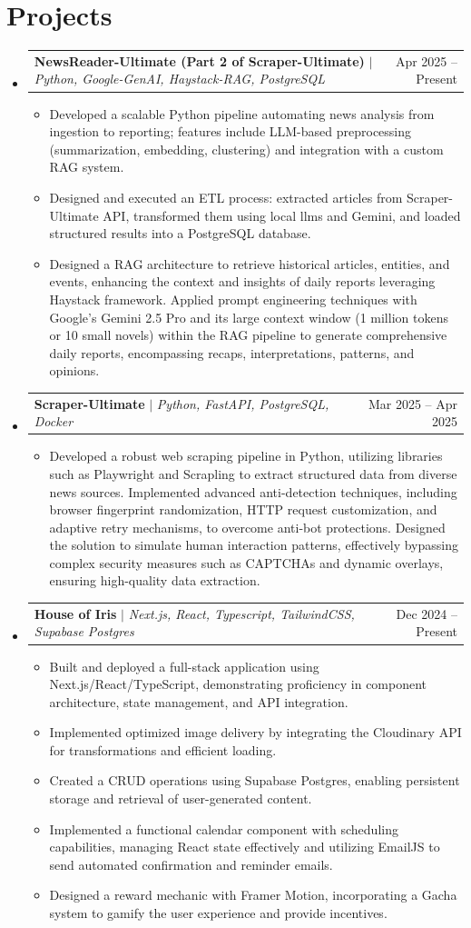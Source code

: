 \documentclass[letterpaper,10pt]{article}
\makeatletter
\newcommand{\resumeItem}[1]{
  \item\small{ {#1 \vspace{-2pt}} } %
}
\newcommand{\resumeProjectHeading}[2]{
  \vspace{-3pt}\item %
  \begin{tabular*}{0.97\textwidth}{l@{\extracolsep{\fill}}r}
    \small#1 & \small #2 \\
  \end{tabular*}\vspace{-5pt} %
}
\newcommand{\resumeItemListStart}{\begin{itemize}}
\newcommand{\resumeItemListEnd}{\end{itemize}\vspace{-2pt}} %
\newcommand{\resumeSubHeadingListStart}{\begin{itemize}[leftmargin=0.15in, label={}]}
\newcommand{\resumeSubHeadingListEnd}{\end{itemize}}
\makeatother
\begin{document}
\section{Projects}
\resumeSubHeadingListStart %
    \resumeProjectHeading
      {\textbf{NewsReader-Ultimate (Part 2 of Scraper-Ultimate)} $|$ \emph{Python, Google-GenAI, Haystack-RAG, PostgreSQL}}{Apr 2025 – Present}
      \resumeItemListStart
        \resumeItem{Developed a scalable Python pipeline automating news analysis from ingestion to reporting; features include LLM-based preprocessing (summarization, embedding, clustering) and integration with a custom RAG system.}
        \resumeItem{Designed and executed an ETL process: extracted articles from Scraper-Ultimate API, transformed them using local llms and Gemini, and loaded structured results into a PostgreSQL database.}
        \resumeItem{Designed a RAG architecture to retrieve historical articles, entities, and events, enhancing the context and insights of daily reports leveraging Haystack framework. Applied prompt engineering techniques with Google's Gemini 2.5 Pro and its large context window (1 million tokens or 10 small novels) within the RAG pipeline to generate comprehensive daily reports, encompassing recaps, interpretations, patterns, and opinions.}
      \resumeItemListEnd

    \resumeProjectHeading
      {\textbf{Scraper-Ultimate} $|$ \emph{Python, FastAPI, PostgreSQL, Docker}}{Mar 2025 – Apr 2025}
      \resumeItemListStart
        \resumeItem{Developed a robust web scraping pipeline in Python, utilizing libraries such as Playwright and Scrapling to extract structured data from diverse news sources. Implemented advanced anti-detection techniques, including browser fingerprint randomization, HTTP request customization, and adaptive retry mechanisms, to overcome anti-bot protections. Designed the solution to simulate human interaction patterns, effectively bypassing complex security measures such as CAPTCHAs and dynamic overlays, ensuring high-quality data extraction.}
      \resumeItemListEnd

    \resumeProjectHeading
      {\textbf{House of Iris} $|$ \emph{Next.js, React, Typescript, TailwindCSS, Supabase Postgres}}{Dec 2024 – Present}
      \resumeItemListStart
        \resumeItem{Built and deployed a full-stack application using Next.js/React/TypeScript, demonstrating proficiency in component architecture, state management, and API integration.}
        \resumeItem{Implemented optimized image delivery by integrating the Cloudinary API for transformations and efficient loading.}
        \resumeItem{Created a CRUD operations using Supabase Postgres, enabling persistent storage and retrieval of user-generated content.}
        \resumeItem{Implemented a functional calendar component with scheduling capabilities, managing React state effectively and utilizing EmailJS to send automated confirmation and reminder emails.}
        \resumeItem{Designed a reward mechanic with Framer Motion, incorporating a Gacha system to gamify the user experience and provide incentives.}
      \resumeItemListEnd
\resumeSubHeadingListEnd

\end{document}
